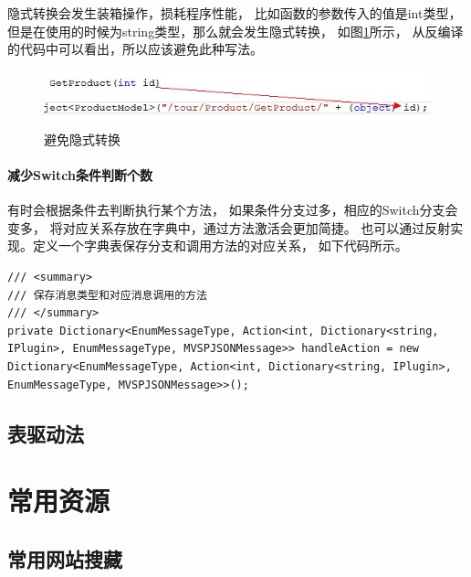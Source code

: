 \documentclass{book}
\begin{document}
隐式转换会发生装箱操作，损耗程序性能，
比如函数的参数传入的值是int类型，
但是在使用的时候为string类型，那么就会发生隐式转换，
如图\ref{fig:AvoidUsingImplicityConvert}所示，
从反编译的代码中可以看出，所以应该避免此种写法。

\begin{figure}[htbp]
	\centering
	\includegraphics[scale=0.8]{AvoidUsingImplicityConvert.jpg}
	\caption{避免隐式转换}
	\label{fig:AvoidUsingImplicityConvert}
\end{figure}

\paragraph{减少Switch条件判断个数}

有时会根据条件去判断执行某个方法，
如果条件分支过多，相应的Switch分支会变多，
将对应关系存放在字典中，通过方法激活会更加简捷。
也可以通过反射实现。定义一个字典表保存分支和调用方法的对应关系，
如下代码所示。

\begin{lstlisting}[language={[Sharp]C}]
/// <summary>
/// 保存消息类型和对应消息调用的方法
/// </summary>
private Dictionary<EnumMessageType, Action<int, Dictionary<string, IPlugin>, EnumMessageType, MVSPJSONMessage>> handleAction = new Dictionary<EnumMessageType, Action<int, Dictionary<string, IPlugin>, EnumMessageType, MVSPJSONMessage>>();
\end{lstlisting}


\subsection{表驱动法}




\section{常用资源}

\subsection{常用网站搜藏}
\end{document}
